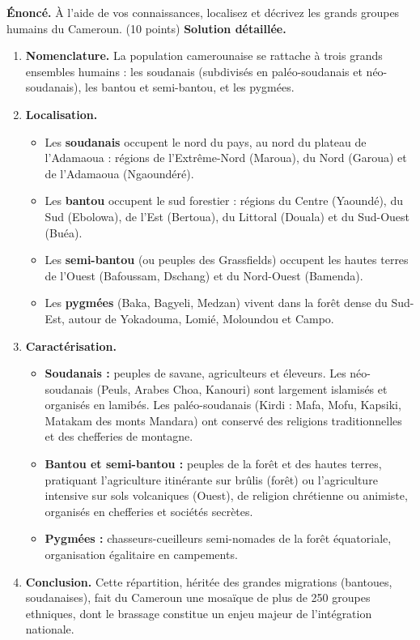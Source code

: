 \documentclass[11pt]{article}
\newcommand{\cle}[1]{{\popxbold\color{popdark}#1}}
\begin{document}
\begin{exoresolu}
\textbf{Énoncé.} À l'aide de vos connaissances, localisez et décrivez les grands groupes humains du Cameroun. (10 points)
\tcblower
\textbf{Solution détaillée.}
\begin{enumerate}
\item \textbf{Nomenclature.} La population camerounaise se rattache à trois grands ensembles humains : les \cle{soudanais} (subdivisés en paléo-soudanais et néo-soudanais), les \cle{bantou} et \cle{semi-bantou}, et les \cle{pygmées}.
\item \textbf{Localisation.}
\begin{itemize}
\item Les \textbf{soudanais} occupent le nord du pays, au nord du plateau de l'Adamaoua : régions de l'Extrême-Nord (Maroua), du Nord (Garoua) et de l'Adamaoua (Ngaoundéré).
\item Les \textbf{bantou} occupent le sud forestier : régions du Centre (Yaoundé), du Sud (Ebolowa), de l'Est (Bertoua), du Littoral (Douala) et du Sud-Ouest (Buéa).
\item Les \textbf{semi-bantou} (ou peuples des Grassfields) occupent les hautes terres de l'Ouest (Bafoussam, Dschang) et du Nord-Ouest (Bamenda).
\item Les \textbf{pygmées} (Baka, Bagyeli, Medzan) vivent dans la forêt dense du Sud-Est, autour de Yokadouma, Lomié, Moloundou et Campo.
\end{itemize}
\item \textbf{Caractérisation.}
\begin{itemize}
\item \textbf{Soudanais :} peuples de savane, agriculteurs et éleveurs. Les néo-soudanais (Peuls, Arabes Choa, Kanouri) sont largement islamisés et organisés en lamibés. Les paléo-soudanais (Kirdi : Mafa, Mofu, Kapsiki, Matakam des monts Mandara) ont conservé des religions traditionnelles et des chefferies de montagne.
\item \textbf{Bantou et semi-bantou :} peuples de la forêt et des hautes terres, pratiquant l'agriculture itinérante sur brûlis (forêt) ou l'agriculture intensive sur sols volcaniques (Ouest), de religion chrétienne ou animiste, organisés en chefferies et sociétés secrètes.
\item \textbf{Pygmées :} chasseurs-cueilleurs semi-nomades de la forêt équatoriale, organisation égalitaire en campements.
\end{itemize}
\item \textbf{Conclusion.} Cette répartition, héritée des grandes migrations (bantoues, soudanaises), fait du Cameroun une mosaïque de plus de 250 groupes ethniques, dont le brassage constitue un enjeu majeur de l'intégration nationale.
\end{enumerate}
\end{exoresolu}
\end{document}
